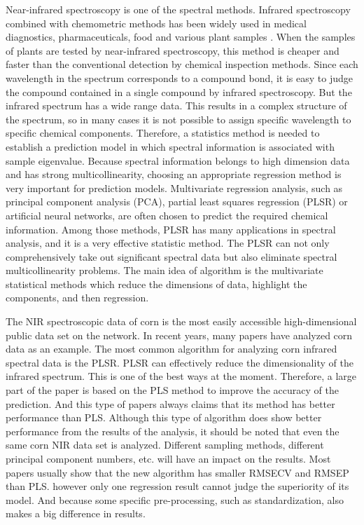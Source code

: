 \documentclass[a4paper,12pt,titlepage]{article} %
\numberwithin{equation}{section}  %
\begin{document}
	Near-infrared spectroscopy is one of the spectral methods. Infrared spectroscopy combined with chemometric methods has been widely used in medical diagnostics, pharmaceuticals, food and various plant samples \citep{1su2006partial}. When the samples of plants are tested by near-infrared spectroscopy, this method is cheaper and faster than the conventional detection by chemical inspection methods. Since each wavelength in the spectrum corresponds to a compound bond, it is easy to judge the compound contained in a single compound by infrared spectroscopy. But the infrared spectrum has a wide range data. This results in a complex structure of the spectrum, so in many cases it is not possible to assign specific wavelength to specific chemical components. Therefore, a statistics method is needed to establish a prediction model in which spectral information is associated with sample eigenvalue. Because spectral information belongs to high dimension data and has strong multicollinearity, choosing an appropriate regression method is very important for prediction models. Multivariate regression analysis, such as principal component analysis (PCA), partial least squares regression (PLSR) or artificial neural networks, are often chosen to predict the required chemical information. Among those methods, PLSR has many applications in spectral analysis, and it is a very effective statistic method. The PLSR can not only comprehensively take out significant spectral data but also eliminate spectral multicollinearity problems. The main idea of algorithm is the multivariate statistical methods which reduce the dimensions of data, highlight the components, and then regression.
	
	The NIR spectroscopic data of corn is the most easily accessible high-dimensional public data set on the network. In recent years, many papers have analyzed corn data as an example. The most common algorithm for analyzing corn infrared spectral data is the PLSR. PLSR can effectively reduce the dimensionality of the infrared spectrum. This is one of the best ways at the moment. Therefore, a large part of the paper is based on the PLS method to improve the accuracy of the prediction. And this type of papers always claims that its method has better performance than PLS. Although this type of algorithm does show better performance from the results of the analysis, it should be noted that even the same corn NIR data set is analyzed. Different sampling methods, different principal component numbers, etc. will have an impact on the results. Most papers usually show that the new algorithm has smaller RMSECV and RMSEP than PLS. however only one regression result cannot judge the superiority of its model. And because some specific pre-processing, such as standardization, also makes a big difference in results.
	
\end{document}
